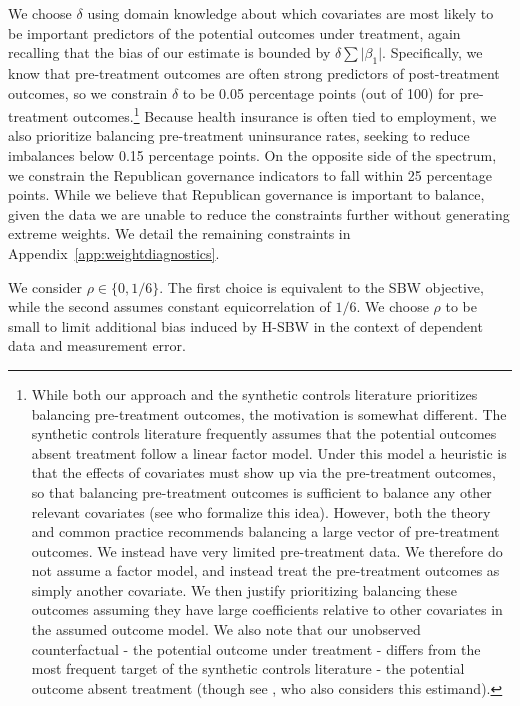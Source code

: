 \documentclass[aoas]{imsart}
\theoremstyle{plain}
\theoremstyle{remark}
\begin{document}
We choose $\delta$ using domain knowledge about which covariates are most likely to be important predictors of the potential outcomes under treatment, again recalling that the bias of our estimate is bounded by $\delta \sum \lvert \beta_1 \rvert$. Specifically, we know that pre-treatment outcomes are often strong predictors of post-treatment outcomes, so we constrain $\delta$ to be 0.05 percentage points (out of 100) for pre-treatment outcomes.\footnote{While both our approach and the synthetic controls literature prioritizes balancing pre-treatment outcomes, the motivation is somewhat different. The synthetic controls literature frequently assumes that the potential outcomes absent treatment follow a linear factor model. Under this model a heuristic is that the effects of covariates must show up via the pre-treatment outcomes, so that balancing pre-treatment outcomes is sufficient to balance any other relevant covariates (see \cite{botosaru2019role} who formalize this idea). However, both the theory and common practice recommends balancing a large vector of pre-treatment outcomes. We instead have very limited pre-treatment data. We therefore do not assume a factor model, and instead treat the pre-treatment outcomes as simply another covariate. We then justify prioritizing balancing these outcomes assuming they have large coefficients relative to other covariates in the assumed outcome model. We also note that our unobserved counterfactual - the potential outcome under treatment - differs from the most frequent target of the synthetic controls literature - the potential outcome absent treatment (though see \cite{agarwal2020synthetic}, who also considers this estimand).} Because health insurance is often tied to employment, we also prioritize balancing pre-treatment uninsurance rates, seeking to reduce imbalances below 0.15 percentage points. On the opposite side of the spectrum, we constrain the Republican governance indicators to fall within 25 percentage points. While we believe that Republican governance is important to balance, given the data we are unable to reduce the constraints further without generating extreme weights. We detail the remaining constraints in Appendix~\ref{app:weightdiagnostics}. 

We consider $\rho \in \{0, 1/6\}$. The first choice is equivalent to the SBW objective, while the second assumes constant equicorrelation of $1/6$. We choose $\rho$ to be small to limit additional bias induced by H-SBW in the context of dependent data and measurement error.
\end{document}

